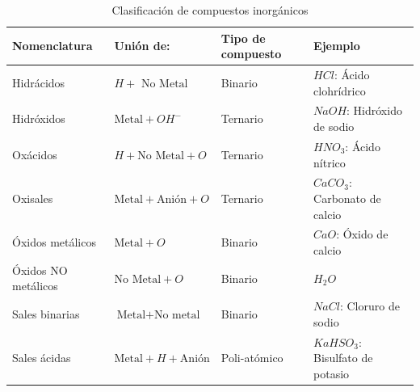 \begin{table}[t]

    \begin{threeparttable}
    \centering
    \caption{Clasificación de compuestos inorgánicos}
    \label{clas_comps}
    {
    
        \begin{tabular}{|p{}|p{}|p{}|p{}|} \hline
            \bfseries{Nomenclatura} & \bfseries{Unión de:} & \bfseries{Tipo de compuesto} & \bfseries{Ejemplo} \\ \hline
            
            Hidrácidos & $H + \text{ No Metal}$ & Binario & $HCl$: Ácido clohrídrico \\ \hline
            
            Hidróxidos & $\text{Metal} + OH^{-}$ & Ternario & $NaOH$: Hidróxido de sodio \\ \hline
            
            Oxácidos & $H + \text{No Metal} + O$ & Ternario & $HNO_3$: Ácido nítrico \\ \hline
            
            Oxisales & $\text{Metal} + \text{Anión} + O$ & Ternario & $CaCO_3$: Carbonato de calcio \\ \hline
            
            Óxidos metálicos & $\text{Metal} + O$ & Binario & $CaO$: Óxido de calcio \\ \hline
            
            Óxidos NO metálicos & $\text{No Metal} + O$ & Binario & $H_{2}O$ \\ \hline
            
            Sales binarias & $\text{Metal} + \text{No metal}$ & Binario & $NaCl$: Cloruro de sodio \\ \hline
            
            Sales ácidas & $\text{Metal} + H + \text{Anión}$ & Poli-atómico & $KaHSO_3$: Bisulfato de potasio \\ \hline
            
        \end{tabular}
    
    }
    
    \begin{tablenotes}
        \item[] 
    \end{tablenotes}
    
    \end{threeparttable}
\end{table}

